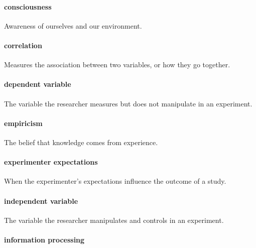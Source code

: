 \documentclass[
]{krantz}
\begin{document}
\paragraph*{consciousness}\label{consciousness}

Awareness of ourselves and our environment.

\paragraph*{correlation}\label{correlation}

Measures the association between two variables, or how they go together.

\paragraph*{dependent variable}\label{dependent-variable}

The variable the researcher measures but does not manipulate in an experiment.

\paragraph*{empiricism}\label{empiricism}

The belief that knowledge comes from experience.

\paragraph*{experimenter expectations}\label{experimenter-expectations}

When the experimenter's expectations influence the outcome of a study.

\paragraph*{independent variable}\label{independent-variable}

The variable the researcher manipulates and controls in an experiment.

\paragraph*{information processing}\label{information-processing}
\end{document}
